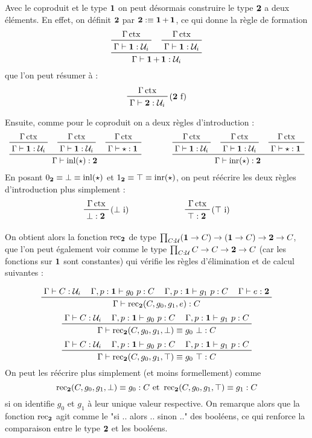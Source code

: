 \documentclass[../../rapport.tex]{subfiles}
\begin{document}
  \begin{example}[Le type $\2$]
    \label{ex:type_2}
    Avec le coproduit et le type $\operatorname{\textbf{1}}$ on peut désormais construire le type $\2$ a deux éléments.
    En effet, on définit $\2$ par $\operatorname{\textbf{2}} :\equiv \operatorname{\textbf{1}} + \operatorname{\textbf{1}}$, ce qui donne la règle de formation
    $$
    \prfinterspace=1.2em
    \prftree{\prftree{\Gamma \ctx}{\Gamma \vdash \1 : \U_i}}{\prftree{\Gamma \ctx}{\Gamma \vdash \1 : \U_i}}
      {\Gamma \vdash \1 + \1 : \U_i}
    $$
    que l'on peut résumer à :
    $$
    \prftree[r]{($\2$ f)}{\Gamma \ctx}{\Gamma \vdash \2 : \U_i}
    $$

    Ensuite, comme pour le coproduit on a deux règles d'introduction :
    $$
    \prfinterspace=1.2em
    \begin{array}{cc}
      \prftree{\prftree{\Gamma \ctx}{\Gamma \vdash \1 : \U_i}}
	{\prftree{\Gamma \ctx}{\Gamma \vdash \1 : \U_i}}
	{\prftree{\Gamma \ctx}{\Gamma \vdash \star : \1}}
	{\Gamma \vdash \inl(\star) : \2} \hspace{1cm}
      &\prftree{\prftree{\Gamma \ctx}{\Gamma \vdash \1 : \U_i}}
	{\prftree{\Gamma \ctx}{\Gamma \vdash \1 : \U_i}}
	{\prftree{\Gamma \ctx}{\Gamma \vdash \star : \1}}
	  {\Gamma \vdash \inr(\star) : \2}
    \end{array}
    $$
    En posant $0_{\operatorname{\textbf{2}}} \equiv \bot \equiv \operatorname{inl}(\star)$ et $1_{\operatorname{\textbf{2}}} \equiv \top \equiv \operatorname{inr}(\star)$,
    on peut réécrire les deux règles d'introduction plus simplement :
    $$
    \begin{array}{cc}
      \prftree[r]{($\bot$ i)}{\Gamma \ctx}{\bot : \2} \hspace{2cm}
      & \prftree[r]{($\top$ i)}{\Gamma \ctx}{\top : \2}
    \end{array}
    $$

    On obtient alors la fonction $\operatorname{rec}_{\operatorname{\textbf{2}}}$ de type $\prod_{C : \mathcal U}(\operatorname{\textbf{1}} \rightarrow C) \rightarrow (\operatorname{\textbf{1}} \rightarrow C) \rightarrow \operatorname{\textbf{2}} \rightarrow C$,
    que l'on peut également voir comme le type $\prod_{C:\mathcal U}C \rightarrow C \rightarrow \operatorname{\textbf{2}} \rightarrow C$ (car les fonctions sur $\operatorname{\textbf{1}}$ sont constantes)
    qui vérifie les règles d'élimination et de calcul suivantes :

    $$
    \prfinterspace=1.2em
    \prftree
      {\Gamma \vdash C :\U_i}
      {\Gamma, p : \1 \vdash g_0\ p : C}
      {\Gamma, p : \1 \vdash g_1\ p : C}
      {\Gamma \vdash e : \2}
      {\Gamma \vdash \rec_{\2}(C, g_0, g_1, e) : C}
    $$
    $$
    \prfinterspace=1.2em
    \prftree{\Gamma \vdash C : \U_i}{\Gamma, p : \1 \vdash g_0\ p : C}{\Gamma, p : \1 \vdash g_1\ p : C}
      {\Gamma \vdash \rec_{\2}(C, g_0, g_1, \bot) \equiv g_0\ \bot : C}
    $$
    $$
    \prfinterspace=1.2em
    \prftree{\Gamma \vdash C : \U_i}{\Gamma, p : \1 \vdash g_0\ p : C}{\Gamma, p : \1 \vdash g_1\ p : C}
      {\Gamma \vdash \rec_{\2}(C, g_0, g_1, \top) \equiv g_0\ \top : C}
    $$
    On peut les réécrire plus simplement (et moins formellement) comme
    $$\operatorname{rec}_{\operatorname{\textbf{2}}}(C, g_0, g_1, \bot) \equiv g_0 : C \text{ et } \operatorname{rec}_{\operatorname{\textbf{2}}}(C, g_0, g_1, \top) \equiv g_1 : C$$
    si on identifie $g_0$ et $g_1$ à leur unique valeur respective.
    On remarque alors que la fonction $\operatorname{rec}_{\operatorname{\textbf{2}}}$ agit comme le "si .. alors .. sinon .." des booléens,
    ce qui renforce la comparaison entre le type $\2$ et les booléens.
  \end{example}
\end{document}
